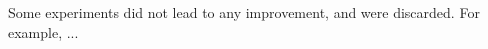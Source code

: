 \documentclass[11pt]{article}
\begin{document}
\begin{multicols}{2}
      Some experiments did not lead to any improvement, and were discarded. For example, ...





\end{multicols}
\end{document}
